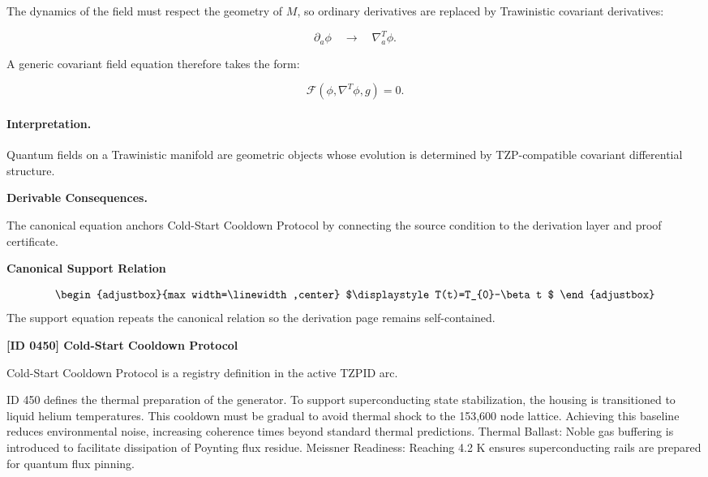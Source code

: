 The dynamics of the field must respect the geometry of $M$, so ordinary derivatives are replaced by Trawinistic covariant derivatives:

\begin{equation}
\partial_a\phi
\quad\longrightarrow\quad
\nabla^T_a\phi .
\end{equation}

A generic covariant field equation therefore takes the form:

\begin{equation}
\mathcal{F}
\left(
\phi,\nabla^T\phi,g
\right)
=
0 .
\end{equation}

\paragraph{Interpretation.}
Quantum fields on a Trawinistic manifold are geometric objects whose evolution is determined by TZP-compatible covariant differential structure.

\par\vspace{0.35em}
\noindent\textbf{Derivable Consequences.}\quad
\begingroup
\footnotesize
\raggedright
The canonical equation anchors Cold-Start Cooldown Protocol by connecting the source condition to the derivation layer and proof certificate.
\par\endgroup

\noindent\textbf{Canonical Support Relation}\par
\[
\begin{adjustbox}{max width=\linewidth,center}
$\displaystyle
T(t)=T_{0}-\beta t
$
\end{adjustbox}
\]
\noindent The support equation repeats the canonical relation so the derivation page remains self-contained.\par

\clearpage
\noindent\textbf{[ID 0450] Cold-Start Cooldown Protocol}\par
\vspace{0.35em}
\begingroup\small
{}
Cold-Start Cooldown Protocol is a registry definition in the active TZPID arc.

ID 450 defines the thermal preparation of the generator. To support superconducting state stabilization, the housing is transitioned to liquid helium temperatures. This cooldown must be gradual to avoid thermal shock to the 153,600 node lattice. Achieving this baseline reduces environmental noise, increasing coherence times beyond standard thermal predictions. Thermal Ballast: Noble gas buffering is introduced to facilitate dissipation of Poynting flux residue. Meissner Readiness: Reaching 4.2 K ensures superconducting rails are prepared for quantum flux pinning.

